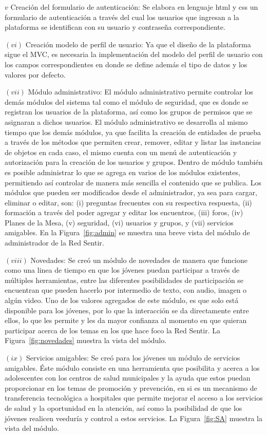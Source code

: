 \documentclass[journal,transmag]{IEEEtran}
\begin{document}
$v$ Creación del formulario de autenticación: Se elabora en lenguaje html y css un formulario de autenticación a través del cual los usuarios que ingresan a la plataforma se identifican con su usuario y contraseña correspondiente.

$(vi)$ Creación modelo de perfil de usuario: Ya que el diseño de la plataforma sigue el MVC, es necesaria la implementación del modelo del perfil de usuario con los campos correspondientes en donde se define además el tipo de datos y los valores por defecto.

$(vii)$ Módulo administrativo: El módulo administrativo permite controlar los demás módulos del sistema tal como el módulo de seguridad, que es donde se registran los usuarios de la plataforma, así como los grupos de permisos que se asignaran a dichos usuarios. El módulo administrativo se desarrolla al mismo tiempo que los demás módulos, ya que facilita la creación de entidades de prueba a través de los métodos que permiten crear, remover, editar y listar  las instancias de objetos en cada caso, el mismo cuenta con un menú de autenticación y autorización para la creación de los usuarios y grupos. Dentro de módulo también es posible administrar lo que se agrega en varios de los módulos existentes, permitiendo así controlar de manera más sencilla el contenido que se publica. Los módulos que pueden ser modificados desde el administrador, ya sea para cargar, eliminar o editar, son: (i) preguntas frecuentes con su respectiva respuesta, (ii) formación a través del poder agregar y editar los encuentros, (iii) foros, (iv) Planes de la Mesa, (v) seguridad, (vi) usuarios y grupos, y (vii) servicios amigables. En la Figura~\ref{fig:admin} se muestra una breve vista del módulo de administrador de la Red Sentir.

$(viii)$ Novedades: Se creó un módulo de novedades de manera que funcione como una linea de tiempo en que los jóvenes puedan participar a través de múltiples herramientas, entre las diferentes posibilidades de participación se encuentran que pueden hacerlo por intermedio de texto, con audio, imagen o algún video. Uno de los valores agregados de este módulo, es que solo está disponible para los jóvenes, por lo que la interacción se da directamente entre ellos, lo que les permite y les da mayor confianza al momento en que quieran participar acerca de los temas en los que hace foco la Red Sentir. La Figura~\ref{fig:novedades} muestra la vista del módulo.

$(ix)$ Servicios amigables: Se creó para los jóvenes un módulo de servicios amigables. Éste módulo 
consiste en una herramienta que posibilita y acerca a los adolescentes con los centros de salud municipales y la ayuda que estos puedan proporcionar en los temas de promoción y prevención, en si es un mecanismo de transferencia tecnológica a hospitales que permite mejorar el acceso a los servicios de salud y la oportunidad en la atención, así como la posibilidad de que los jóvenes realicen veeduría y control a estos servicios. La Figura~\ref{fig:SA} muestra la vista del módulo. 
\end{document}
